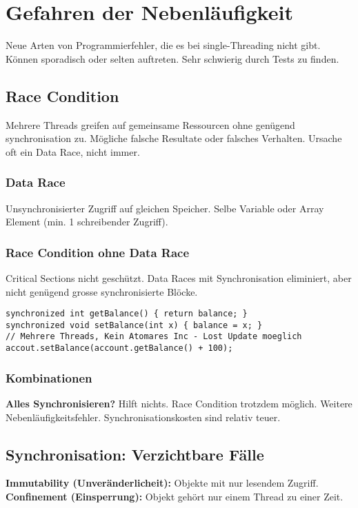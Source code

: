 \section{Gefahren der Nebenläufigkeit}
Neue Arten von Programmierfehler, die es bei single-Threading nicht gibt. 
Können sporadisch oder selten auftreten.
Sehr schwierig durch Tests zu finden.

\subsection{Race Condition}
Mehrere Threads greifen auf gemeinsame Ressourcen ohne genügend synchronisation zu.
Mögliche falsche Resultate oder falsches Verhalten.
Ursache oft ein Data Race, nicht immer.

\subsubsection{Data Race}
Unsynchronisierter Zugriff auf gleichen Speicher.
Selbe Variable oder Array Element (min. 1 schreibender Zugriff).

\subsubsection{Race Condition ohne Data Race}
Critical Sections nicht geschützt. 
Data Races mit Synchronisation eliminiert, aber nicht genügend grosse synchronisierte Blöcke.
\begin{lstlisting}
synchronized int getBalance() { return balance; }
synchronized void setBalance(int x) { balance = x; }
// Mehrere Threads, Kein Atomares Inc - Lost Update moeglich 
accout.setBalance(account.getBalance() + 100);
\end{lstlisting}

\subsubsection{Kombinationen}
\textbf{Alles Synchronisieren?} Hilft nichts. Race Condition trotzdem möglich. Weitere Nebenläufigkeitsfehler.
Synchronisationskosten sind relativ teuer.

\subsection{Synchronisation: Verzichtbare Fälle}
\textbf{Immutability (Unveränderlicheit):} Objekte mit nur lesendem Zugriff.
\textbf{Confinement (Einsperrung):} Objekt gehört nur einem Thread zu einer Zeit.


